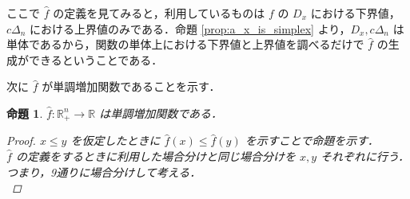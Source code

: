 \documentclass[a4paper,11pt]{jreport}
\newtheorem{proposition}{命題}
\begin{document}
ここで $ \hat{f} $ の定義を見てみると，利用しているものは $ f $ の $ D_x $ における下界値，$ c \Delta_n $ における上界値のみである．命題 \ref{prop:a_x_is_simplex} より，$ D_x, c \Delta_n $ は単体であるから，関数の単体上における下界値と上界値を調べるだけで $ \hat{f} $ の生成ができるということである．\par
次に $ \hat{f} $ が単調増加関数であることを示す．

\begin{proposition}
$ \hat{f} : \mathbb{R}_+^n \to \mathbb{R} $ は単調増加関数である．

\begin{proof}
$ x \leq y $ を仮定したときに $ \hat{f}(x) \leq \hat{f}(y) $ を示すことで命題を示す．\\
$ \hat{f} $ の定義をするときに利用した場合分けと同じ場合分けを $ x, y $ それぞれに行う．つまり，9通りに場合分けして考える．\\


\end{proof}
\end{proposition}
\end{document}
